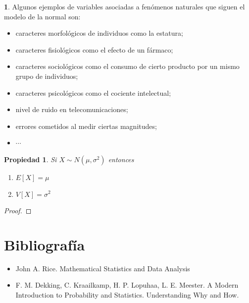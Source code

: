 \documentclass[]{book}
\providecommand{\tightlist}{%
  \setlength{\itemsep}{0pt}\setlength{\parskip}{0pt}}
\theoremstyle{plain}
\newtheorem{property}[theorem]{Propiedad}
\theoremstyle{definition}
\theoremstyle{definition} %
\newcommand{\thistheoremname}{}
\newtheorem{genericthm}[theorem]{\thistheoremname}
\newenvironment{customdef}[1]
  {\renewcommand{\thistheoremname}{#1}%
   \begin{genericthm}}
  {\end{genericthm}}
\begin{document}
\begin{customdef}{Aplicaciones de la Normal}
Algunos ejemplos de variables asociadas a fenómenos naturales que siguen
el modelo de la normal son:

\begin{itemize}
\item
  caracteres morfológicos de individuos como la estatura;
\item
  caracteres fisiológicos como el efecto de un fármaco;
\item
  caracteres sociológicos como el consumo de cierto producto por un
  mismo grupo de individuos;
\item
  caracteres psicológicos como el cociente intelectual;
\item
  nivel de ruido en telecomunicaciones;
\item
  errores cometidos al medir ciertas magnitudes;
  \item $\cdots$
\end{itemize}
\end{customdef}

\begin{property}
  Si $X \sim  N(\mu, \sigma^2)$ entonces 
  \begin{enumerate}
    \item $E[X] = \mu$
    \item $V[X] = \sigma^2$
  \end{enumerate}
\end{property}

\begin{proof}
   
\end{proof}

\hypertarget{bibliografuxeda}{%
\section{Bibliografía}\label{bibliografuxeda}}

\begin{itemize}
\tightlist
\item
  John A. Rice. Mathematical Statistics and Data Analysis
\item
  F. M. Dekking, C. Kraailkamp, H. P. Lopuhaa, L. E. Meester. A Modern
  Introduction to Probability and Statistics. Understanding Why and How.
\end{itemize}
\end{document}
